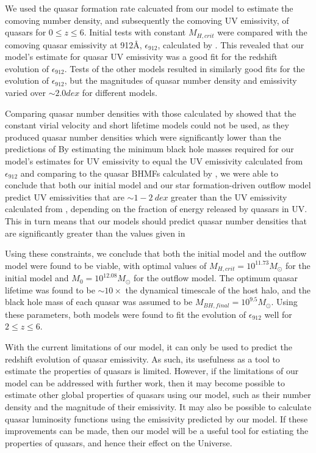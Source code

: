 \documentclass[12pt]{article}%
\begin{document}
We used the quasar formation rate calcuated from our model to estimate the comoving number density, and subsequently the comoving UV emissivity, of quasars for $0\leq z\leq6$. Initial tests with constant $M_{H,crit}$ were compared with the comoving quasar emissivity at 912\AA, $\epsilon_{912}$, calculated by \cite{Haardt_Madau}. This revealed that our model's estimate for quasar UV emissivity was a good fit for the redshift evolution of $\epsilon_{912}$. Tests of the other models resulted in similarly good fits for the evolution of $\epsilon_{912}$, but the magnitudes of quasar number density and emissivity varied over $\sim2.0dex$ for different models.\par

Comparing quasar number densities with those calculated by \cite{Hopkins} show\-ed that the constant virial velocity and short lifetime models could not be used, as they produced quasar number densities which were significantly lower than the predictions of \citeauthor{Hopkins} By estimating the minimum black hole masses required for our model's estimates for UV emissivity to equal the UV emissivity calculated from $\epsilon_{912}$ and comparing to the quasar BHMFs calculated by \cite{BH_mass_fns}, we were able to conclude that both our initial model and our star formation-driven outflow model predict UV emissivities that are $\sim1-2\:dex$ greater than the UV emissivity calculated from \citeauthor{Haardt_Madau}, depending on the fraction of energy released by quasars in UV. This in turn means that our models should predict quasar number densities that are significantly greater than the values given in \citeauthor{Hopkins}\par

Using these constraints, we conclude that both the initial model and the outflow model were found to be viable, with optimal values of $M_{H,crit}=10^{11.73}M_\odot$ for the initial model and $M_0=10^{12.08}M_\odot$ for the outflow model. The optimum quasar lifetime was found to be $\sim10\times$ the dynamical timescale of the host halo, and the black hole mass of each quasar was assumed to be $M_{BH,final}=10^{9.5}M_\odot$. Using these parameters, both models were found to fit the evolution of $\epsilon_{912}$ well for $2\leq z\leq 6$.\par

With the current limitations of our model, it can only be used to predict the redshift evolution of quasar emissivity. As such, its usefulness as a tool to estimate the properties of quasars is limited. However, if the limitations of our model can be addressed with further work, then it may become possible to estimate other global properties of quasars using our model, such as their number density and the magnitude of their emissivity. It may also be possible to calculate quasar luminosity functions using the emissivity predicted by our model. If these improvements can be made, then our model will be a useful tool for estiating the properties of quasars, and hence their effect on the Universe.


\end{document}
